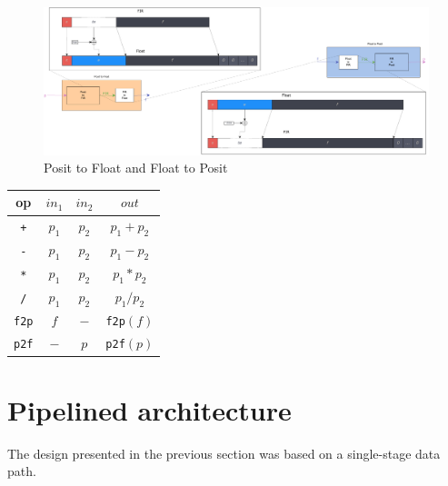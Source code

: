 \begin{figure}[H]
    \centering
    \includegraphics[width=\textwidth]{figures/posit_to_float_and_float_to_posit.pdf}
    \caption{Posit to Float and Float to Posit}
    \label{fig:posittofloatandfloattoposit}
\end{figure}

\begin{table}
\begin{center}
\begin{tabular}{||c c c | c||}
    \hline
    op & $in_1$ & $in_2$ & $out$ \\ [0.5ex]
    \hline\hline
    \texttt{+} & $p_1$ & $p_2$ & $p_1 + p_2$ \\
    \hline
    \texttt{-} & $p_1$ & $p_2$ & $p_1 - p_2$ \\
    \hline
    \texttt{*} & $p_1$ & $p_2$ & $p_1 * p_2$ \\
    \hline
    \texttt{/} & $p_1$ & $p_2$ & $p_1 / p_2$ \\
    \hline
    \texttt{f2p} & $f$ & $-$ & \texttt{f2p}$(f)$ \\
    \hline
    \texttt{p2f} & $-$ & $p$ & \texttt{p2f}$(p)$ \\
    \hline
\end{tabular}
\label{Tab:table_ops_ppu}
\end{center}
\end{table}




\section{Pipelined architecture}\label{pipelined_ppu_section}


The design presented in the previous section was based on a single-stage data path.


